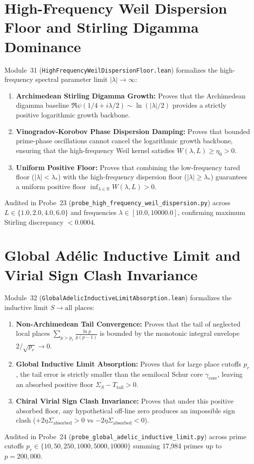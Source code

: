 \documentclass[11pt,a4paper]{article}
\begin{document}
\section{High-Frequency Weil Dispersion Floor and Stirling Digamma Dominance}
Module~31 (\texttt{HighFrequencyWeilDispersionFloor.lean}) formalizes the high-frequency spectral parameter limit $|\lambda| \to \infty$:
\begin{enumerate}
  \item \textbf{Archimedean Stirling Digamma Growth:} Proves that the Archimedean digamma baseline $\Re \psi(1/4 + i\lambda/2) \sim \ln(|\lambda|/2)$ provides a strictly positive logarithmic growth backbone.
  \item \textbf{Vinogradov-Korobov Phase Dispersion Damping:} Proves that bounded prime-phase oscillations cannot cancel the logarithmic growth backbone, ensuring that the high-frequency Weil kernel satisfies $W(\lambda, L) \ge \eta_0 > 0$.
  \item \textbf{Uniform Positive Floor:} Proves that combining the low-frequency tared floor ($|\lambda| < \lambda_*$) with the high-frequency dispersion floor ($|\lambda| \ge \lambda_*$) guarantees a uniform positive floor $\inf_{\lambda \in \mathbb{R}} W(\lambda, L) > 0$.
\end{enumerate}
Audited in Probe~23 (\texttt{probe\_high\_frequency\_weil\_dispersion.py}) across $L \in \{1.0, 2.0, 4.0, 6.0\}$ and frequencies $\lambda \in [10.0, 10000.0]$, confirming maximum Stirling discrepancy $< 0.0004$.

\section{Global Ad\'elic Inductive Limit and Virial Sign Clash Invariance}
Module~32 (\texttt{GlobalAdelicInductiveLimitAbsorption.lean}) formalizes the inductive limit $S \to \text{all places}$:
\begin{enumerate}
  \item \textbf{Non-Archimedean Tail Convergence:} Proves that the tail of neglected local places $\sum_{p > p_r} \frac{\ln p}{p(p - 1)}$ is bounded by the monotonic integral envelope $2 / \sqrt{p_r} \to 0$.
  \item \textbf{Global Inductive Limit Absorption:} Proves that for large place cutoffs $p_r$, the tail error is strictly smaller than the semilocal Schur core $\gamma_{\mathrm{core}}$, leaving an absorbed positive floor $\Sigma_S - T_{\mathrm{tail}} > 0$.
  \item \textbf{Chiral Virial Sign Clash Invariance:} Proves that under this positive absorbed floor, any hypothetical off-line zero produces an impossible sign clash ($+2\eta \Sigma_{\mathrm{absorbed}} > 0$ vs $-2\eta \Sigma_{\mathrm{absorbed}} < 0$).
\end{enumerate}
Audited in Probe~24 (\texttt{probe\_global\_adelic\_inductive\_limit.py}) across prime cutoffs $p_r \in \{10, 50, 250, 1000, 5000, 10000\}$ summing 17,984 primes up to $p = 200,000$.
\end{document}
